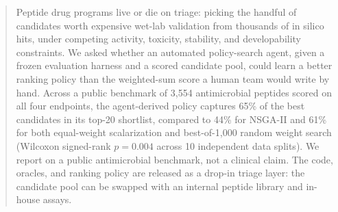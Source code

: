 \begin{abstract}
Peptide drug programs live or die on triage: picking the handful of candidates worth expensive wet-lab validation from thousands of in silico hits, under competing activity, toxicity, stability, and developability constraints.
We asked whether an automated policy-search agent, given a frozen evaluation harness and a scored candidate pool, could learn a better ranking policy than the weighted-sum score a human team would write by hand.
Across a public benchmark of 3{,}554 antimicrobial peptides scored on all four endpoints, the agent-derived policy captures 65\% of the best candidates in its top-20 shortlist, compared to 44\% for NSGA-II and 61\% for both equal-weight scalarization and best-of-1{,}000 random weight search (Wilcoxon signed-rank $p = 0.004$ across 10 independent data splits).
We report on a public antimicrobial benchmark, not a clinical claim.
The code, oracles, and ranking policy are released as a drop-in triage layer: the candidate pool can be swapped with an internal peptide library and in-house assays.
\end{abstract}
